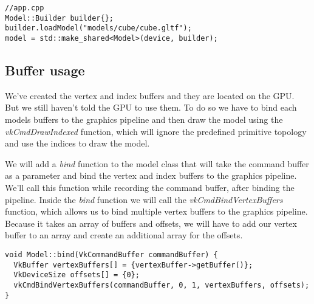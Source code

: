 \documentclass[12pt]{report} \usepackage{preamble}
\begin{document}
\begin{lstlisting}[Language=C++]
//app.cpp
Model::Builder builder{};
builder.loadModel("models/cube/cube.gltf");
model = std::make_shared<Model>(device, builder);
\end{lstlisting}

\subsection{Buffer usage}

We've created the vertex and index buffers and they are located on the GPU. But we still haven't told the GPU to use them.
To do so we have to bind each models buffers to the graphics pipeline and then draw the model using the \textit{vkCmdDrawIndexed} function,
which will ignore the predefined primitive topology and use the indices to draw the model.

We will add a \textit{bind} function to the model class that will take the command buffer as a parameter and bind the vertex and index buffers to the graphics pipeline.
We'll call this function while recording the command buffer, after binding the pipeline. Inside the \textit{bind} function we will call the \textit{vkCmdBindVertexBuffers}
function, which allows us to bind multiple vertex buffers to the graphics pipeline. Because it takes an array of buffers and offsets, we will have to add our vertex buffer
to an array and create an additional array for the offsets.

\begin{lstlisting}[Language=C++]
void Model::bind(VkCommandBuffer commandBuffer) {
  VkBuffer vertexBuffers[] = {vertexBuffer->getBuffer()};
  VkDeviceSize offsets[] = {0};
  vkCmdBindVertexBuffers(commandBuffer, 0, 1, vertexBuffers, offsets);
}
\end{lstlisting}
\end{document}
